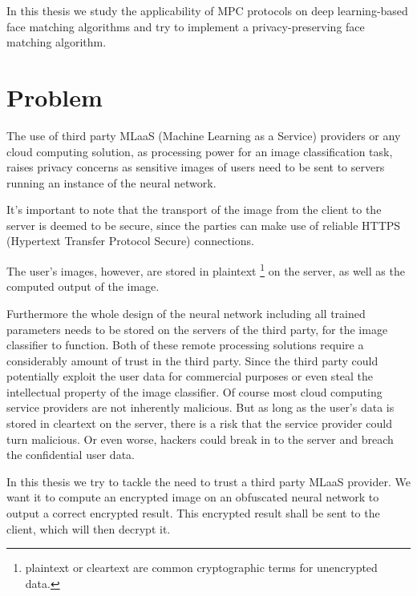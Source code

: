 In this thesis we study the applicability of MPC protocols on deep learning-based face matching algorithms and try to implement a privacy-preserving face matching algorithm.

\section{Problem}
The use of third party MLaaS (Machine Learning as a Service) providers or any cloud computing solution, as processing power for an image classification task, raises privacy concerns as sensitive images of users need to be sent to servers running an instance of the neural network.

It's important to note that the transport of the image from the client to the server is deemed to be secure, since the parties can make use of reliable HTTPS (Hypertext Transfer Protocol Secure) connections.

The user's images, however, are stored in plaintext \footnote{plaintext or cleartext are common cryptographic terms for unencrypted data.} on the server, as well as the computed output of the image.

Furthermore the whole design of the neural network including all trained parameters needs to be stored on the servers of the third party, for the image classifier to function. Both of these remote processing solutions require a considerably amount of trust in the third party. Since the third party could potentially exploit the user data for commercial purposes or even steal the intellectual property of the image classifier. Of course most cloud computing service providers are not inherently malicious. But as long as the user's data is stored in cleartext on the server, there is a risk that the service provider could turn malicious. Or even worse, hackers could break in to the server and breach the confidential user data.

In this thesis we try to tackle the need to trust a third party MLaaS provider. We want it to compute an encrypted image on an obfuscated neural network to output a correct encrypted result. This encrypted result shall be sent to the client, which will then decrypt it.\\

